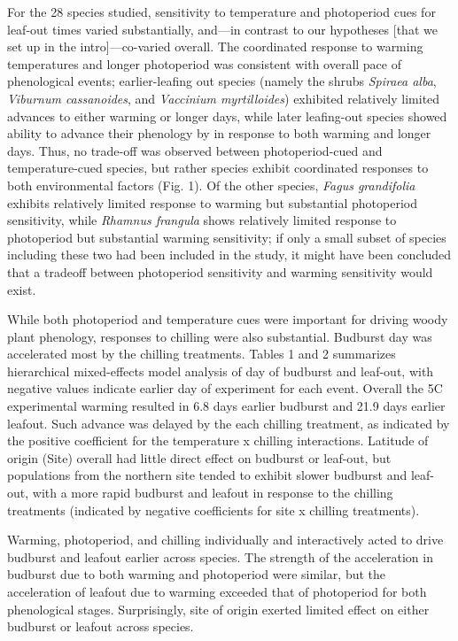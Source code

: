 \documentclass{article}
\begin{document}
For the 28 species studied, sensitivity to temperature and photoperiod cues for leaf-out times varied substantially, and---in contrast to our hypotheses [that we set up in the intro]---co-varied overall. The coordinated response to warming temperatures and longer photoperiod was consistent with overall pace of phenological events; earlier-leafing out species (namely the shrubs \emph{Spiraea alba}, \emph{Viburnum cassanoides}, and \emph{Vaccinium myrtilloides}) exhibited relatively limited advances to either warming or longer days, while later leafing-out species showed ability to advance their phenology by in response to both warming and longer days. Thus, no trade-off was observed between photoperiod-cued and temperature-cued species, but rather species exhibit coordinated responses to both environmental factors (Fig. 1). Of the other species, \emph{Fagus grandifolia} exhibits relatively limited response to warming but substantial photoperiod sensitivity, while \emph{Rhamnus frangula} shows relatively limited response to photoperiod but substantial warming sensitivity; if only a small subset of species including these two had been included in the study, it might have been concluded that a tradeoff between photoperiod sensitivity and warming sensitivity would exist. %

While both photoperiod and temperature cues were important for driving woody plant phenology, responses to chilling were also substantial. Budburst day was accelerated most by the chilling treatments. Tables 1 and 2 summarizes hierarchical mixed-effects model analysis of day of budburst and leaf-out, with negative values indicate earlier day of experiment for each event. Overall the 5\degree C experimental warming resulted in 6.8 days earlier budburst and 21.9 days earlier leafout. Such advance was delayed by the each chilling treatment, as indicated by the positive coefficient for the temperature x chilling interactions. Latitude of origin (Site) overall had little direct effect on budburst or leaf-out, but populations from the northern site tended to exhibit slower budburst and leaf-out, with a more rapid budburst and leafout in response to the chilling treatments (indicated by negative coefficients for site x chilling treatments).

Warming, photoperiod, and chilling individually and interactively acted to drive budburst and leafout earlier across species. The strength of the acceleration in budburst due to both warming and photoperiod were similar, but the acceleration of leafout due to warming exceeded that of photoperiod for both phenological stages. Surprisingly, site of origin exerted limited effect on either budburst or leafout across species. 
\end{document}
